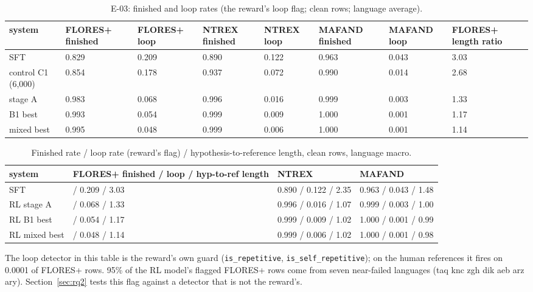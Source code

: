 \begin{table}[t]
\centering\footnotesize
\setlength{\tabcolsep}{4pt}
\caption{E-03: finished and loop rates (the reward's loop flag; clean rows; language average).}\label{tab:e03-finish}
\begin{adjustbox}{max width=\linewidth}\begin{tabular}{@{}llllllll@{}}
\toprule
system & FLORES+ finished & FLORES+ loop & NTREX finished & NTREX loop & MAFAND finished & MAFAND loop & FLORES+ length ratio \\
\midrule
SFT & 0.829 & 0.209 & 0.890 & 0.122 & 0.963 & 0.043 & 3.03 \\
control C1 (6,000) & 0.854 & 0.178 & 0.937 & 0.072 & 0.990 & 0.014 & 2.68 \\
stage A & 0.983 & 0.068 & 0.996 & 0.016 & 0.999 & 0.003 & 1.33 \\
B1 best & 0.993 & 0.054 & 0.999 & 0.009 & 1.000 & 0.001 & 1.17 \\
mixed best & 0.995 & 0.048 & 0.999 & 0.006 & 1.000 & 0.001 & 1.14 \\
\bottomrule
\end{tabular}\end{adjustbox}
\end{table}

\begin{table}[t]
\centering\footnotesize
\setlength{\tabcolsep}{4pt}
\caption{Finished rate / loop rate (reward's flag) / hypothesis-to-reference length, clean rows, language macro.}\label{tab:finish}
\begin{tabularx}{\linewidth}{@{}l>{\raggedright\arraybackslash}Xll@{}}
\toprule
system & FLORES+ finished / loop / hyp-to-ref length & NTREX & MAFAND \\
\midrule
SFT & 0.829 / 0.209 / 3.03 & 0.890 / 0.122 / 2.35 & 0.963 / 0.043 / 1.48 \\
RL stage A & 0.983 / 0.068 / 1.33 & 0.996 / 0.016 / 1.07 & 0.999 / 0.003 / 1.00 \\
RL B1 best & 0.993 / 0.054 / 1.17 & 0.999 / 0.009 / 1.02 & 1.000 / 0.001 / 0.99 \\
RL mixed best & 0.995 / 0.048 / 1.14 & 0.999 / 0.006 / 1.02 & 1.000 / 0.001 / 0.98 \\
\bottomrule
\end{tabularx}
\end{table}

 The loop detector in this table is the reward's own guard (\texttt{is\_\allowbreak{}repetitive}, \texttt{is\_\allowbreak{}self\_\allowbreak{}repetitive}); on the human references it fires on 0.0001 of FLORES+ rows. 95\% of the RL model's flagged FLORES+ rows come from seven near-failed languages (taq knc zgh dik aeb arz ary). Section~\ref{sec:rq2} tests this flag against a detector that is not the reward's.


